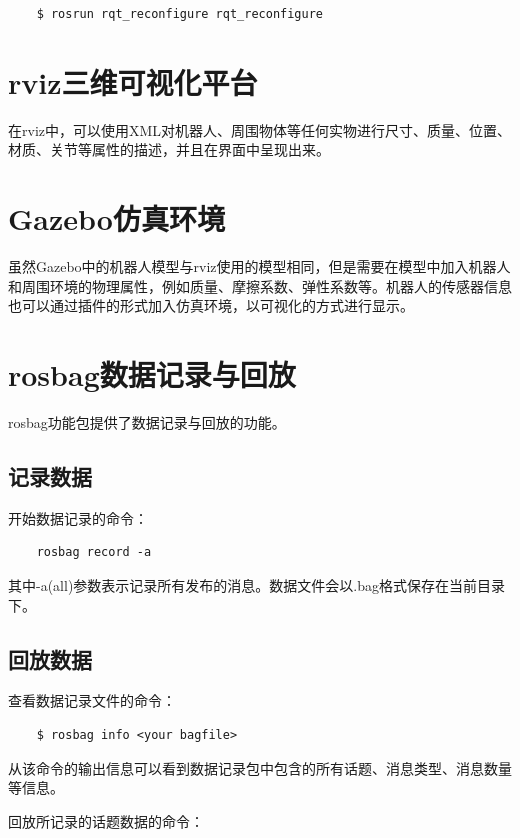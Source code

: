 \documentclass[9pt, oneside]{book}
\begin{document}
\begin{verbatim}
    $ rosrun rqt_reconfigure rqt_reconfigure
\end{verbatim}

\section{rviz三维可视化平台}

在rviz中，可以使用XML对机器人、周围物体等任何实物进行尺寸、质量、位置、材质、关节等属性的描述，并且在界面中呈现出来。

\section{Gazebo仿真环境}

虽然Gazebo中的机器人模型与rviz使用的模型相同，但是需要在模型中加入机器人和周围环境的物理属性，例如质量、摩擦系数、弹性系数等。机器人的传感器信息也可以通过插件的形式加入仿真环境，以可视化的方式进行显示。

\section{rosbag数据记录与回放}

rosbag功能包提供了数据记录与回放的功能。

\subsection{记录数据}

开始数据记录的命令：

\begin{verbatim}
    rosbag record -a
\end{verbatim}

其中-a(all)参数表示记录所有发布的消息。数据文件会以.bag格式保存在当前目录下。

\subsection{回放数据}

查看数据记录文件的命令：

\begin{verbatim}
    $ rosbag info <your bagfile>
\end{verbatim}

从该命令的输出信息可以看到数据记录包中包含的所有话题、消息类型、消息数量等信息。

回放所记录的话题数据的命令：
\end{document}
